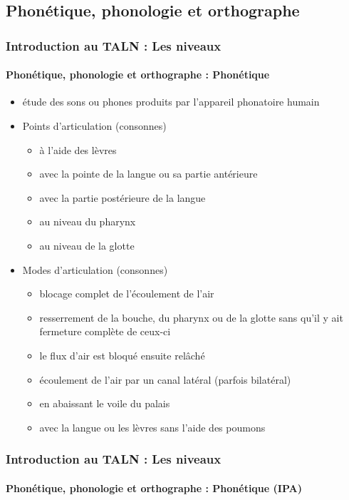 \documentclass{beamer}
\begin{document}
\subsection{Phonétique, phonologie et orthographe}

\begin{frame}
\frametitle{Introduction au TALN : Les niveaux}
\framesubtitle{Phonétique, phonologie et orthographe : Phonétique}

\begin{itemize}
	\item étude des sons ou phones produits par l'appareil phonatoire humain
	\item Points d'articulation (consonnes)
	\begin{itemize}
		\item {} à l'aide des lèvres
		\item {} avec la pointe de la langue ou sa partie antérieure
		\item {} avec la partie postérieure de la langue
		\item {} au niveau du pharynx
		\item {} au niveau de la glotte
	\end{itemize}
	\item Modes d'articulation (consonnes)
	\begin{itemize}
		\item {} blocage complet de l'écoulement de l'air
		\item {} resserrement de la bouche, du pharynx ou de la glotte sans qu'il y ait fermeture complète de ceux-ci
		\item {} le flux d'air est bloqué ensuite relâché
		\item {} écoulement de l'air par un canal latéral (parfois bilatéral)
		\item {} en abaissant le voile du palais
		\item {} avec la langue ou les lèvres sans l'aide des poumons
	\end{itemize}
\end{itemize}

\end{frame}

\begin{frame}
\frametitle{Introduction au TALN : Les niveaux}
\framesubtitle{Phonétique, phonologie et orthographe : Phonétique (IPA)}

\begin{center}
\end{center}

\end{frame}
\end{document}
